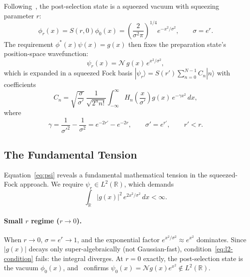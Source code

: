 \documentclass[11pt]{article}
\begin{document}
Following~\cite{das2025}, the post-selection state is a squeezed vacuum
with squeezing parameter $r$:
\begin{equation}\label{eq:phi}
  \phi_r(x) = S(r,0)\phi_0(x) =
  \left(\frac{2}{\sigma^2\pi}\right)^{1/4} e^{-x^2/\sigma^2},
  \qquad \sigma = e^r.
\end{equation}
The requirement $\phi^*(x)\psi(x) = g(x)$ then fixes the preparation state's
position-space wavefunction:
\begin{equation}\label{eq:psi}
  \psi_r(x) = \mathcal{N}\,g(x)\,e^{x^2/\sigma^2},
\end{equation}
which is expanded in a squeezed Fock basis
$|\psi_r\rangle = S(r')\sum_{n=0}^{N-1} C_n|n\rangle$ with coefficients
\begin{equation}\label{eq:Cn}
  C_n = \sqrt{\frac{\sigma}{\sigma'}}\,\frac{1}{\sqrt{2^n n!}}
  \int_{-\infty}^{\infty} H_n\!\left(\frac{x}{\sigma'}\right)
  g(x)\,e^{-\gamma x^2}\,dx,
\end{equation}
where
\begin{equation}\label{eq:gamma}
  \gamma = \frac{1}{\sigma'^2} - \frac{1}{\sigma^2}
  = e^{-2r'} - e^{-2r}, \qquad \sigma' = e^{r'}, \qquad r' < r.
\end{equation}

\subsection{The Fundamental Tension}\label{sec:tension}

Equation~\eqref{eq:psi} reveals a fundamental mathematical tension in the
squeezed-Fock approach.  We require $\psi_r \in L^2(\mathbb{R})$, which demands
\begin{equation}\label{eq:l2-condition}
  \int_{\mathbb{R}} |g(x)|^2\,e^{2x^2/\sigma^2}\,dx < \infty.
\end{equation}

\paragraph{Small $r$ regime ($r \to 0$).}
When $r \to 0$, $\sigma = e^r \to 1$, and the exponential factor
$e^{x^2/\sigma^2} \approx e^{x^2}$ dominates.  Since $|g(x)|$ decays only
super-algebraically (not Gaussian-fast), condition~\eqref{eq:l2-condition}
fails: the integral diverges.  At $r = 0$ exactly, the post-selection state
is the vacuum $\phi_0(x)$, and~\cite[Eq.~10]{das2025} confirms
$\psi_0(x) = \mathcal{N}g(x)e^{x^2} \notin L^2(\mathbb{R})$.
\end{document}
